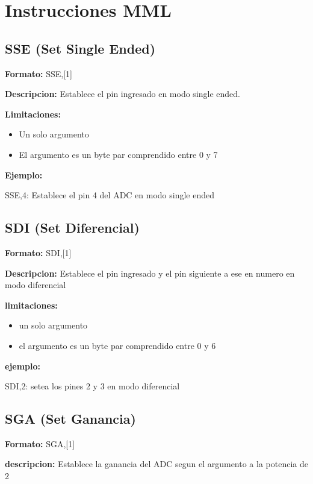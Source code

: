 
\section{Instrucciones MML}\label{ap:instrucciones}

\subsection{SSE (Set Single Ended)}

\textbf{Formato:} SSE,[1]

\textbf{Descripcion:}
Establece el pin ingresado en modo single ended.

\textbf{Limitaciones:}
\begin{itemize}
  \item Un solo argumento
  \item El argumento es un byte par comprendido entre 0 y 7
\end{itemize}

\textbf{Ejemplo:}

SSE,4: Establece el pin 4 del ADC en modo single ended

\subsection{SDI (Set Diferencial)}

\textbf{Formato:} SDI,[1]

\textbf{Descripcion:}
Establece el pin ingresado y el pin siguiente a ese en numero en modo diferencial

\textbf{limitaciones:}
\begin{itemize}
  \item un solo argumento
  \item el argumento es un byte par comprendido entre 0 y 6
\end{itemize}

\textbf{ejemplo:}

SDI,2: setea los pines 2 y 3 en modo diferencial

\subsection{SGA (Set Ganancia)}

\textbf{Formato:} SGA,[1]

\textbf{descripcion:}
Establece la ganancia del ADC segun el argumento a la potencia de 2

